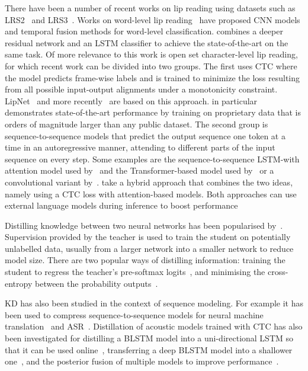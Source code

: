 \documentclass{article}
\def\newpara{\vspace{1pt}}
\begin{document}
\newpara{}
There have been a number of recent works on lip reading using
datasets such as LRS2~\cite{Chung17} and LRS3~\cite{Afouras18d}. 
Works on word-level lip reading~\cite{Chung16} have proposed CNN models and temporal fusion methods
for word-level classification. \cite{Stafylakis17} combines a deeper residual
network and an LSTM classifier to achieve the state-of-the-art on the same task.
Of more relevance to this work is open set character-level lip reading, for which recent work can be divided into two groups. 
The first uses CTC where the model predicts frame-wise labels and is trained
to minimize the loss resulting from all possible input-output alignments under a monotonicity constraint.
LipNet~\cite{Assael16} and more recently~\cite{Shillingford18,makino2019recurrent} are based on this
approach. \cite{makino2019recurrent} in particular demonstrates state-of-the-art performance by training on proprietary data that is orders of magnitude larger than any public dataset. 
The second group is sequence-to-sequence models that 
predict the output sequence one token at a time in an autoregressive manner, attending
to different parts of the input sequence on every step. 
Some examples are the sequence-to-sequence LSTM-with attention model used by~\cite{Chung17} and the
Transformer-based model used by~\cite{Afouras18b} or a convolutional variant by~\cite{zhang2019spatio}.
\cite{petridis2018audio,Afouras19} take a hybrid approach that combines the two ideas, namely using a CTC loss
with attention-based models.
Both approaches can use external language models during inference to boost
performance\cite{Kannan17,Maas15}



\newpara{}
Distilling knowledge between two neural networks has been popularised
by~\cite{hinton2015distilling}. Supervision provided by the teacher is used to train the student on
potentially unlabelled data, usually from a larger network into a smaller network to reduce model size. 
There are two popular ways of distilling information: training the student to regress the teacher's
pre-softmax logits~\cite{ba2014deep}, and minimising the cross-entropy between the probability outputs~\cite{li2014learning,hinton2015distilling}. 


\newpara{} 
KD has also been studied in the context of sequence modeling.
For example it has been used to compress sequence-to-sequence
models for neural machine translation~\cite{kim2016sequence} and ASR~\cite{kim2019knowledge}.
Distillation of acoustic models trained with CTC has also been investigated for
distilling a BLSTM model into a uni-directional LSTM so that
it can be used online~\cite{kim2017improved}, transferring a deep BLSTM model into a shallower one~\cite{ding2019compression},
and the posterior fusion of multiple models to improve performance~\cite{Kurata2019GuidingCP}.
\end{document}
